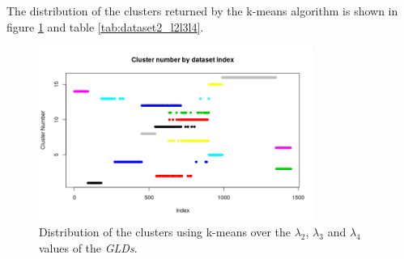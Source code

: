 The distribution of the clusters returned by the k-means algorithm is shown in figure \ref{fig:dataset2_l2l3l4} and table \ref{tab:dataset2_l2l3l4}.

\begin{figure}[H]
    \centering
    \includegraphics[width=0.8\textwidth]{img/gld_clustering/Dataset2/nuevo/clusters_by_index.png}
    \caption{Distribution of the clusters using k-means over the $\lambda_{2}$, $\lambda_{3}$ and $\lambda_{4}$ values of the \textit{GLDs}.}
    \label{fig:dataset2_l2l3l4}
\end{figure}

